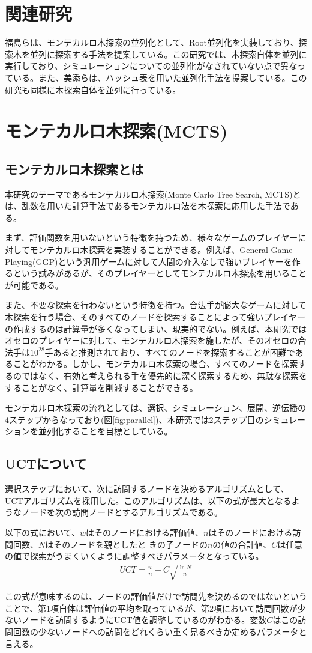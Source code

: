\documentclass[10pt, a4paper]{jsarticle}
\begin{document}
\section{関連研究}
福島らは、モンテカルロ木探索の並列化として、Root並列化を実装しており、探索木を並列に探索する手法を提案している\cite{bib:paper1}。この研究では、木探索自体を並列に実行しており、シミュレーションについての並列化がなされていない点で異なっている。また、美添らは、ハッシュ表を用いた並列化手法を提案している\cite{bib:paper2}。この研究も同様に木探索自体を並列に行っている。
\section{モンテカルロ木探索(MCTS)}
\subsection{モンテカルロ木探索とは}
本研究のテーマであるモンテカルロ木探索(Monte Carlo Tree Search, MCTS)とは、乱数を用いた計算手法であるモンテカルロ法を木探索に応用した手法である。
\par まず、評価関数を用いないという特徴を持つため、様々なゲームのプレイヤーに対してモンテカルロ木探索を実装することができる。例えば、General Game Playing(GGP)という汎用ゲームに対して人間の介入なしで強いプレイヤーを作るという試みがあるが、そのプレイヤーとしてモンテカルロ木探索を用いることが可能である。
\par また、不要な探索を行わないという特徴を持つ。合法手が膨大なゲームに対して木探索を行う場合、そのすべてのノードを探索することによって強いプレイヤーの作成するのは計算量が多くなってしまい、現実的でない。例えば、本研究ではオセロのプレイヤーに対して、モンテカルロ木探索を施したが、そのオセロの合法手は$10^{28}$手あると推測されており、すべてのノードを探索することが困難であることがわかる。しかし、モンテカルロ木探索の場合、すべてのノードを探索するのではなく、有効と考えられる手を優先的に深く探索するため、無駄な探索をすることがなく、計算量を削減することができる。
\par モンテカルロ木探索の流れとしては、選択、シミュレーション、展開、逆伝播の4ステップからなっており(図\ref{fig:parallel})、本研究では2ステップ目のシミュレーションを並列化することを目標としている。
\subsection{UCTについて}
選択ステップにおいて、次に訪問するノードを決めるアルゴリズムとして、UCTアルゴリズムを採用した。このアルゴリズムは、以下の式が最大となるようなノードを次の訪問ノードとするアルゴリズムである。
\par 以下の式において、$w$はそのノードにおける評価値、$n$はそのノードにおける訪問回数、$N$はそのノードを親としたと きの子ノードの$n$の値の合計値、$C$は任意の値で探索がうまくいくように調整すべきパラメータとなっている。
\begin{eqnarray}
    UCT = \frac{w}{n} + C\sqrt{\frac{\ln{N}}{n}}
\end{eqnarray}
\par
この式が意味するのは、ノードの評価値だけで訪問先を決めるのではないということで、第1項自体は評価値の平均を取っているが、第2項において訪問回数が少ないノードを訪問するようにUCT値を調整しているのがわかる。変数$C$はこの訪問回数の少ないノードへの訪問をどれくらい重く見るべきか定めるパラメータと言える。
\end{document}

